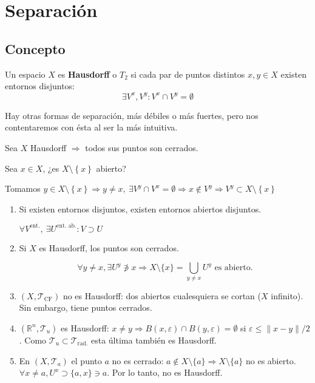 \chapter{Separación}%
\label{cha:separacion}

\section{Concepto}%
\label{sec:concepto}
\begin{defi}
Un espacio $X$ es \textbf{Hausdorff} o $T_2$ si cada par de puntos distintos $x, y \in X$ existen entornos disjuntos:
\[
\exists V^x, V^y: V^x \cap V^y = \emptyset
\]
\end{defi}
Hay otras formas de separación, más débiles o más fuertes, pero nos contentaremos con ésta al ser la más intuitiva.

\begin{prop}
Sea $X$ Hausdorff $\Rightarrow$ todos sus puntos son cerrados.
\end{prop}
\begin{demo}
Sea $x \in X$, ¿es $X \setminus \left\{ x \right\}$ abierto? 

Tomamos $y \in X \setminus \left\{ x \right\} \Rightarrow y \neq x,\ \exists V^y \cap V^x = \emptyset \Rightarrow x \not\in V^y \Rightarrow V^y \subset X \setminus \left\{ x \right\}$
\end{demo}
\begin{obs}
\begin{enumerate}
    \item Si existen entornos disjuntos, existen entornos abiertos disjuntos.
    \begin{demo}
        $\forall V^{\text{ent.}},\ \exists U^{\text{ent. ab.}}: V \supset U$
    \end{demo}
    \item Si $X$ es Hausdorff, los puntos son cerrados.
    \begin{demo}    
    \[
    \forall y \neq x, \exists U^y \not\ni x \Rightarrow X \setminus \{x\} = \bigcup_{y \neq x} U^y  \text{ es abierto.} 
    \]
    \end{demo}
    \item $\left( X, \mathcal{T}_{\text{CF}} \right)$ no es Hausdorff: dos abiertos cualesquiera se cortan ($X$ infinito). Sin embargo, tiene puntos cerrados.

    \item $\left( \mathbb{R}^n, \mathcal{T}_{u} \right)$ es Hausdorff: $x \neq y \Rightarrow B\left( x, \varepsilon \right) \cap B\left( y, \varepsilon \right) = \emptyset$ si $\varepsilon \le \lVert x - y \rVert / 2$. Como $\mathcal{T}_{u} \subset \mathcal{T}_{\text{rad.}}$ esta última también es Hausdorff.

    \item En $\left( X, \mathcal{T}_a \right)$ el punto $a$ no es cerrado: $a \not\in X \setminus \{a\} \Rightarrow X \setminus \{a\}$ no es abierto. $\forall x \neq a, U^x \supset \{a, x\} \ni a$. Por lo tanto, no es Hausdorff. 
\end{enumerate}
\end{obs}

